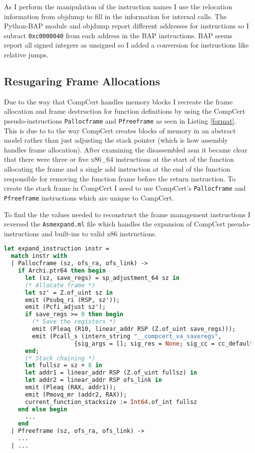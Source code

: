 As I perform the manipulation of the instruction names I use the relocation information from objdump to fill in the information for internal calls. The Python-BAP module and objdump report different addresses for instructions so I subract \texttt{0xc0000040} from each address in the BAP instructions. BAP seems report all signed integers as unsigned so I added a conversion for instructions like relative jumps.

\subsection{Resugaring Frame Allocations}

Due to the way that CompCert handles memory blocks I recreate the frame allocation and frame destruction for function definitions by using the CompCert pseudo-instructions \texttt{Pallocframe} and \texttt{Pfreeframe} as seen in Listing \ref{format}. This is due to to the way CompCert creates blocks of memory in an abstract model rather than just adjusting the stack pointer (which is how assembly handles frame allocation). After examining the disassembled asm it became clear that there were three or five x86\_64 instructions at the start of the function allocating the frame and a single add instruction at the end of the function responsible for removing the function frame before the return instruction. To create the stack frame in CompCert I need to use CompCert's \texttt{Pallocframe} and \texttt{Pfreeframe} instructions which are unique to CompCert. 

To find the the values needed to reconstruct the frame management instructions I reversed the \texttt{Asmexpand.ml} file which handles the expansion of CompCert pseudo-instructions and built-ins to valid x86 instructions.

\begin{lstlisting}[language=OCaml, caption=Asmexpand.ml, firstnumber=496, framexleftmargin=14pt,]
let expand_instruction instr =
  match instr with
  | Pallocframe (sz, ofs_ra, ofs_link) ->
    if Archi.ptr64 then begin
      let (sz, save_regs) = sp_adjustment_64 sz in
      (* Allocate frame *)
      let sz' = Z.of_uint sz in
      emit (Psubq_ri (RSP, sz'));
      emit (Pcfi_adjust sz');
      if save_regs >= 0 then begin
        (* Save the registers *)
        emit (Pleaq (R10, linear_addr RSP (Z.of_uint save_regs)));
        emit (Pcall_s (intern_string "__compcert_va_saveregs",
                    {sig_args = []; sig_res = None; sig_cc = cc_default}))
      end;
      (* Stack chaining *)
      let fullsz = sz + 8 in
      let addr1 = linear_addr RSP (Z.of_uint fullsz) in
      let addr2 = linear_addr RSP ofs_link in
      emit (Pleaq (RAX, addr1));
      emit (Pmovq_mr (addr2, RAX));
      current_function_stacksize := Int64.of_int fullsz
    end else begin
      ...
    end
  | Pfreeframe (sz, ofs_ra, ofs_link) ->
    ...
  | ...
\end{lstlisting}

